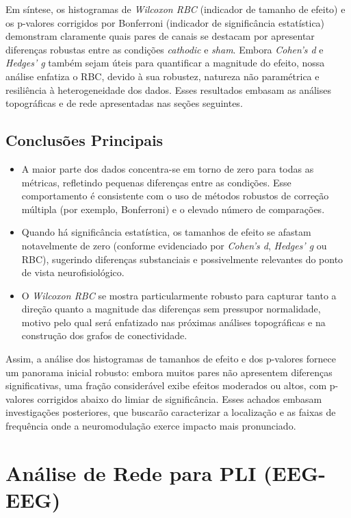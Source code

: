 Em síntese, os histogramas de \emph{Wilcoxon RBC} (indicador de tamanho de efeito) e os p-valores corrigidos por Bonferroni (indicador de significância estatística) demonstram claramente quais pares de canais se destacam por apresentar diferenças robustas entre as condições \emph{cathodic} e \emph{sham}. Embora \emph{Cohen's d} e \emph{Hedges' g} também sejam úteis para quantificar a magnitude do efeito, nossa análise enfatiza o RBC, devido à sua robustez, natureza não paramétrica e resiliência à heterogeneidade dos dados. Esses resultados embasam as análises topográficas e de rede apresentadas nas seções seguintes.

\subsection{Conclusões Principais}
\begin{itemize}
    \item A maior parte dos dados concentra-se em torno de zero para todas as métricas, refletindo pequenas diferenças entre as condições. Esse comportamento é consistente com o uso de métodos robustos de correção múltipla (por exemplo, Bonferroni) e o elevado número de comparações.
    \item Quando há significância estatística, os tamanhos de efeito se afastam notavelmente de zero (conforme evidenciado por \emph{Cohen's d}, \emph{Hedges' g} ou RBC), sugerindo diferenças substanciais e possivelmente relevantes do ponto de vista neurofisiológico.
    \item O \emph{Wilcoxon RBC} se mostra particularmente robusto para capturar tanto a direção quanto a magnitude das diferenças sem pressupor normalidade, motivo pelo qual será enfatizado nas próximas análises topográficas e na construção dos grafos de conectividade.
\end{itemize}

Assim, a análise dos histogramas de tamanhos de efeito e dos p-valores fornece um panorama inicial robusto: embora muitos pares não apresentem diferenças significativas, uma fração considerável exibe efeitos moderados ou altos, com p-valores corrigidos abaixo do limiar de significância. Esses achados embasam investigações posteriores, que buscarão caracterizar a localização e as faixas de frequência onde a neuromodulação exerce impacto mais pronunciado.


\section{Análise de Rede para PLI (EEG-EEG)}
\label{sec:rede_pli_eeg}

